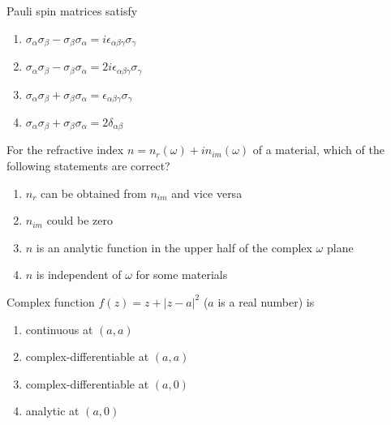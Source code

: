     \item Pauli spin matrices satisfy
    \begin{enumerate}
        \item $\sigma_{\alpha} \sigma_{\beta} - \sigma_{\beta} \sigma_{\alpha} = i \epsilon_{\alpha \beta \gamma} \sigma_{\gamma}$
        \item $\sigma_{\alpha} \sigma_{\beta} - \sigma_{\beta} \sigma_{\alpha} = 2i \epsilon_{\alpha \beta \gamma} \sigma_{\gamma}$
        \item $\sigma_{\alpha} \sigma_{\beta} + \sigma_{\beta} \sigma_{\alpha} = \epsilon_{\alpha \beta \gamma} \sigma_{\gamma}$
        \item $\sigma_{\alpha} \sigma_{\beta} + \sigma_{\beta} \sigma_{\alpha} = 2\delta_{\alpha \beta}$
    \end{enumerate}
    \item For the refractive index $n = n_r(\omega) + i n_{im}(\omega)$ of a material, which of the following statements are correct?
\begin{enumerate}
    \item $n_r$ can be obtained from $n_{im}$ and vice versa
    \item $n_{im}$ could be zero
    \item $n$ is an analytic function in the upper half of the complex $\omega$ plane
    \item $n$ is independent of $\omega$ for some materials
\end{enumerate}

\item Complex function $f(z) = z + |z - a|^2$ ($a$ is a real number) is
\begin{enumerate}
    \item continuous at $(a, a)$
    \item complex-differentiable at $(a, a)$
    \item complex-differentiable at $(a, 0)$
    \item analytic at $(a, 0)$
\end{enumerate}


